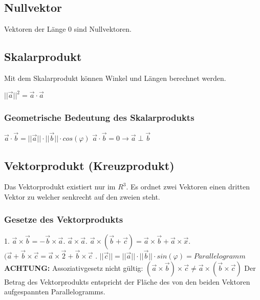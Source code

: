 \documentclass[11pt,a4paper,onecolumn]{article}
\begin{document}
\begin{flushleft}
\subsection{Nullvektor}
Vektoren der Länge 0 sind Nullvektoren.

\subsection{Skalarprodukt}
Mit dem Skalarprodukt können Winkel und Längen berechnet werden.

$ ||\vec{a}||^{2} = \vec{a}\cdot\vec{a}$

\subsubsection{Geometrische Bedeutung des Skalarprodukts}
$ \vec{a} \cdot \vec{b} = ||\vec{a}|| \cdot ||\vec{b} || \cdot cos(\varphi)$\linebreak
$ \vec{a} \cdot \vec{b} = 0 \rightarrow \vec{a} \perp \vec{b}$\linebreak


\subsection{Vektorprodukt (Kreuzprodukt)}
Das Vektorprodukt existiert nur im $R^{3}$. Es ordnet zwei Vektoren einen dritten Vektor zu welcher senkrecht auf den zweien steht.

\subsubsection{Gesetze des Vektorprodukts}
1. $\vec{a} \times \vec{b} = -\vec{b}\times\vec{a}$. $\vec{a}\times\vec{a}$. $ \vec{a}\times(\vec{b}+\vec{c}) = \vec{a}\times\vec{b}+\vec{a}\times\vec{x}$. $ (\vec{a}+\vec{b}\times\vec{c} = \vec{a}\times\vec{2} + \vec{b}\times\vec{c}$ . $||\vec{c}|| = ||\vec{a}|| \cdot ||\vec{b}|| \cdot sin(\varphi) = Parallelogramm $ \linebreak\linebreak
\textbf{ACHTUNG:} Assoziativgesetz nicht gültig:\linebreak
$(\vec{a}\times\vec{b})\times \vec{c} \neq \vec{a}\times(\vec{b}\times\vec{c})$\linebreak
Der Betrag des Vektorprodukts entspricht der Fläche des von den beiden Vektoren aufgespannten Parallelogramms.



\end{flushleft}
\end{document}
